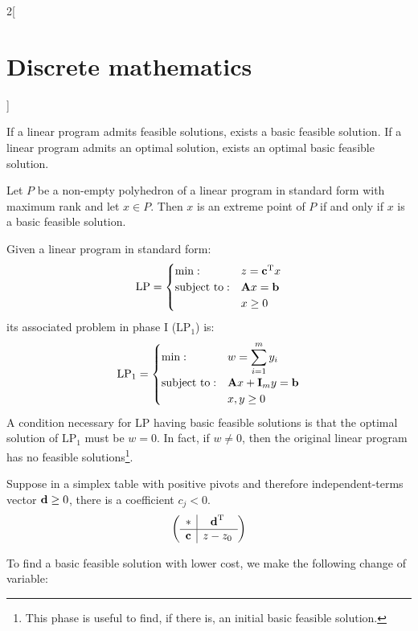 \documentclass[../../../main_math.tex]{subfiles}
\begin{document}
\begin{multicols}{2}[\section{Discrete mathematics}]
\begin{definition}
  \end{definition}
  \begin{proposition}
    If a linear program admits feasible solutions, exists a basic feasible solution. If a linear program admits an optimal solution, exists an optimal basic feasible solution.
  \end{proposition}
  \begin{theorem}
    Let $P$ be a non-empty polyhedron of a linear program in standard form with maximum rank and let $x\in P$. Then $x$ is an extreme point of $P$ if and only if $x$ is a basic feasible solution.
  \end{theorem}
  \begin{definition}
    Given a linear program in standard form:
    $$\text{LP}=
      \begin{cases}
        \min:              & z={\boldsymbol{\mathrm{c}}}^{\mathrm{T}}x \\
        \text{subject to}: & \boldsymbol{\mathrm{A}}x=\boldsymbol{\mathrm{b}}        \\
                           & x\geq 0
      \end{cases}$$ its associated problem in phase I ($\text{LP}_1$) is: $$\text{LP}_1=
      \begin{cases}
        \min:              & \displaystyle w=\sum_{i=1}^my_i \\
        \text{subject to}: & \boldsymbol{\mathrm{A}}x+\boldsymbol{\mathrm{I}}_my=\boldsymbol{\mathrm{b}}        \\
                           & x,y\geq 0
      \end{cases}$$
    A condition necessary for LP having basic feasible solutions is that the optimal solution of $\text{LP}_1$ must be $w=0$. In fact, if $w\ne 0$, then the original linear program has no feasible solutions\footnote{This phase is useful to find, if there is, an initial basic feasible solution.}.
  \end{definition}
  \begin{proposition}
    Suppose in a simplex table with positive pivots and therefore independent-terms vector $\boldsymbol{\mathrm{d}}\geq 0$, there is a coefficient $c_j<0$. $$\left(\begin{array}{c|c}
          *      & {\boldsymbol{\mathrm{d}}}^{\mathrm{T}} \\
          \hline
          \boldsymbol{\mathrm{c}} & z-z_0
        \end{array}\right)$$
  \end{proposition}
  To find a basic feasible solution with lower cost, we make the following change of variable:
  \begin{enumerate}

\end{enumerate}
\end{multicols}
\end{document}
